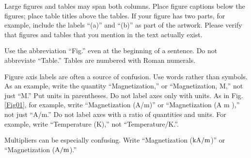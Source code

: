 \documentclass{fullpaper_hutech}
\begin{document}
Large figures and tables may span both columns. Place figure captions below the figures; place table titles above the tables. If your figure has two parts, for example, include the labels ``(a)'' and ``(b)'' as part of the artwork. Please verify that figures and tables that you mention in the text actually exist.

Use the abbreviation ``Fig.'' even at the beginning of a sentence. Do not abbreviate ``Table.'' Tables are numbered with Roman numerals.

Figure axis labels are often a source of confusion. Use words rather than symbols. As an example, write the quantity ``Magnetization,'' or ``Magnetization, M,'' not just ``M.'' Put units in parentheses. Do not label axes only with units. As in Fig. \ref{Fig01}, for example, write ``Magnetization (A/m)'' or ``Magnetization (A m ),'' not just ``A/m.'' Do not label axes with a ratio of quantities and units. For example, write ``Temperature (K),'' not ``Temperature/K.''.

Multipliers can be especially confusing. Write ``Magnetization ($\rm kA/m$)'' or ``Magnetization ($\rm A/m$).''
\end{document}
